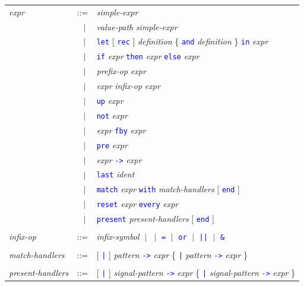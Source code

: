 \documentclass[11pt,titlepage,twoside]{report}
\newcommand{\alt}{\;|\;}
\newcommand{\Let}{\mbox{{\tt let}}}
\newcommand{\Rec}{\mbox{{\tt rec}}}
\newcommand{\In}{\mbox{{\tt in}}}
\newcommand{\And}{\mbox{{\tt and}}}
\newcommand{\Fun}{\mbox{{\tt fun}}}
\newcommand{\Function}{\mbox{{\tt function}}}
\newcommand{\If}{\mbox{{\tt if}}}
\newcommand{\Then}{\mbox{{\tt then}}}
\newcommand{\Else}{\mbox{{\tt else}}}
\newcommand{\Not}{\mbox{{\tt not}}}
\newcommand{\Up}{\mbox{{\tt up}}}
\newcommand{\Pre}{\mbox{{\tt pre}}}
\newcommand{\Last}{\mbox{{\tt last}}}
\newcommand{\Run}{\mbox{{\tt run}}}
\newcommand{\Fby}{\mbox{{\tt fby}}}
\newcommand{\Minusgreater}{\mbox{{\tt ->}}}
\renewcommand{\Reset}{\mbox{{\tt reset}}}
\newcommand{\Every}{\mbox{{\tt every}}}
\newcommand{\End}{\mbox{{\tt end}}}
\newcommand{\Match}[2]{\mbox{\tt match}\ #1\ \mbox{\tt with}\ #2 \End}
\newcommand{\term}[1]{\textcolor{Blue}{\tt #1}}
\newcommand{\nterm}[1]{\textcolor{BrickRed}{\it #1}}
\newcommand{\term}[1]{{\tt #1}}
\newcommand{\nterm}[1]{{\em #1}}
\begin{document}
\begin{center}
\begin{tabular}{lcl}
\nterm{expr}
   & ::=        & \nterm{simple-expr} \\
   & $\;\;\alt$ & \nterm{value-path} \nterm{simple-expr} \\
   & $\;\;\alt$ & \term{\Let} [ \term{\Rec} ] \nterm{definition}
                  \{ \term{\And} \nterm{definition} \} \term{\In} 
                  \nterm{expr} \\
   & $\;\;\alt$ & \term{\If} \nterm{expr} \term{\Then} \nterm{expr}
                  \term{\Else} \nterm{expr} \\
   & $\;\;\alt$ & \nterm{prefix-op} \nterm{expr} \\
   & $\;\;\alt$ & \nterm{expr} \nterm{infix-op} \nterm{expr} \\
   & $\;\;\alt$ & \term{\Up} \nterm{expr} \\
   & $\;\;\alt$ & \term{\Not} \nterm{expr} \\
      & $\;\;\alt$ & \nterm{expr} \term{\Fby} \nterm{expr} \\
   & $\;\;\alt$ & \term{\Pre} \nterm{expr} \\
   & $\;\;\alt$ & \nterm{expr} \term{\Minusgreater} \nterm{expr} \\
   & $\;\;\alt$ & \term{\Last} \nterm{ident} \\
   & $\;\;\alt$ & \term{match} \nterm{expr} \term{with} 
                  \nterm{match-handlers} [ \term{end} ] \\
   & $\;\;\alt$ & \term{reset} \nterm{expr} \term{every} \nterm{expr} \\ 
   & $\;\;\alt$ & \term{present} \nterm{present-handlers} [ \term{end} ]
\\ \\
\nterm{infix-op}                
& ::=        &
                \nterm{infix-symbol} 
                $\alt$ \term{*} 
                $\alt$ \term{=} 
                $\alt$ \term{or}
                $\alt$ \term{||}  
                $\alt$ \term{\&}
\\
\\
\nterm{match-handlers}
   & ::=        & [ \term{|} ] 
                  \nterm{pattern} \term{\Minusgreater} \nterm{expr}
                  \{ \term{|} 
                  \nterm{pattern} \term{\Minusgreater} \nterm{expr} \}
\\
\\
\nterm{present-handlers}
   & ::=        & [ \term{|} ] 
                  \nterm{signal-pattern} \term{->} \nterm{expr}
                  \{ \term{|}
                  \nterm{signal-pattern} \term{->} \nterm{expr} \} 
\end{tabular}
\end{center}
\end{document}
